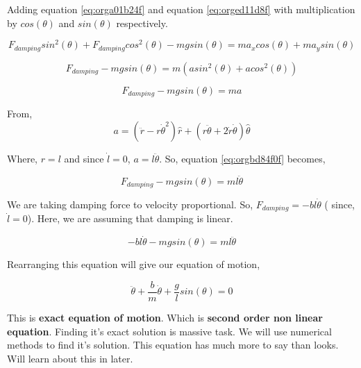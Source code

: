 \documentclass[11pt,a4paper]{article}
\begin{document}
Adding equation \ref{eq:orga01b24f} and equation \ref{eq:orged11d8f} with multiplication by \(cos(\theta)\) and \(sin(\theta)\) respectively.

\begin{equation*}
\label{eq:org1654464}
F_{damping}sin^{2}(\theta)+F_{damping}cos^{2}(\theta)-mgsin(\theta)=ma_{x}cos(\theta)+ma_{y}sin(\theta)
\end{equation*}

\begin{equation*}
\label{eq:org877166e}
F_{damping}-mgsin(\theta)=m(asin^{2}(\theta)+acos^{2}(\theta))
\end{equation*}

\begin{equation}
\label{eq:orgbd84f0f}
F_{damping}-mgsin(\theta)=ma
\end{equation}

From,
\begin{equation*}
\label{eq:org20d75d8}
a = (\ddot{r}-r\dot{\theta}^{2})\hat{r} + (r \ddot{\theta}+2\dot{r}\dot{\theta})\hat{\theta}
\end{equation*}

Where,  \(r=l\) and since \(\dot{l}=0\), \(a=l\ddot{\theta}\). So, equation \ref{eq:orgbd84f0f} becomes,

\begin{equation*}
\label{eq:org9f84f10}
F_{damping}-mgsin(\theta)=ml\ddot{\theta}
\end{equation*}

We are taking damping force to velocity proportional. So, \(F_{damping}=-bl\dot{\theta}\) ( since, \(\dot{l}=0\)). Here, we are assuming that damping is linear. 

\begin{equation*}
\label{eq:org254e8b7}
-bl\dot{\theta}-mgsin(\theta)=ml\ddot{\theta}
\end{equation*}


Rearranging this equation will give our equation of motion,

\begin{equation}
\label{eq:org00bdaf7}
\ddot{\theta}+\frac{b}{m}\dot{\theta}+\frac{g}{l}sin(\theta)=0
\end{equation}

This is \textbf{exact equation of motion}. Which is \textbf{second order non linear equation}. Finding it's exact solution is massive task. We will use numerical methods to find it's solution. This equation has much more to say than looks. Will learn about this in later.
\end{document}
